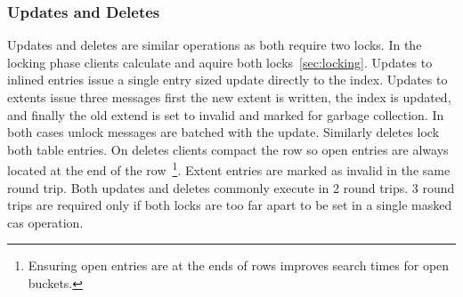 


\subsubsection{Updates and Deletes}

Updates and deletes are similar operations as both require
two locks. In the locking phase clients calculate and aquire
both locks~\ref{sec:locking}. Updates to inlined entries
issue a single entry sized update directly to the index.
Updates to extents issue three messages first the new extent
is written, the index is updated, and finally the old extend
is set to invalid and marked for garbage collection. In both
cases unlock messages are batched with the update. Similarly
deletes lock both table entries. On deletes clients compact
the row so open entries are always located at the end of the
row~\footnote{Ensuring open entries are at the ends of rows
improves search times for open buckets.}. Extent entries are
marked as invalid in the same round trip. Both updates and
deletes commonly execute in 2 round trips. 3 round trips are
required only if both locks are too far apart to be set in a
single masked cas operation.

